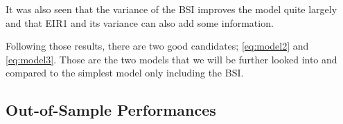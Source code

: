 \documentclass[12pt,a4paper,oneside]{book}
\begin{document}
It was also seen that the variance of the BSI improves the model quite largely and that EIR1 and its variance can also add some information.


Following those results, there are two good candidates; \autoref{eq:model2} and \ref{eq:model3}. Those are the two models that we will be further looked into and compared to the simplest model only including the BSI.












\subsection{Out-of-Sample Performances}
\end{document}
